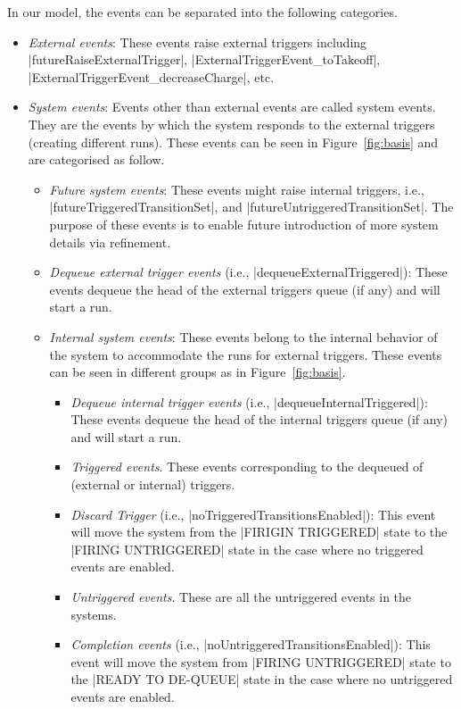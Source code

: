 In our \EventB model, the events can be separated into the following
categories.
\begin{itemize}
\item \emph{External events}: These events raise external triggers
  including |futureRaiseExternalTrigger|, |ExternalTriggerEvent_toTakeoff|,
  |ExternalTriggerEvent_decreaseCharge|, etc.
  
\item \emph{System events}: Events other than external events are
  called system events. They are the events by which the system responds to
  the external triggers (creating different runs).  These events can be
  seen in Figure~\ref{fig:basis} and are categorised as follow.
  \begin{itemize}
  \item \emph{Future system events}: These events might raise internal
    triggers, i.e., |futureTriggeredTransitionSet|, and
    |futureUntriggeredTransitionSet|.  The purpose of these events is
    to enable future introduction of more system details via refinement.
    
  \item \emph{Dequeue external trigger events} (i.e.,
    |dequeueExternalTriggered|): These events dequeue the head of the
    external triggers queue (if any) and will start a run.

  \item \emph{Internal system events}: These events belong to the
    internal behavior of the system to accommodate the runs for external
    triggers.  These events can be seen in different groups as in
    Figure~\ref{fig:basis}.
    \begin{itemize}
    \item \emph{Dequeue internal trigger events} (i.e.,
      |dequeueInternalTriggered|): These events dequeue the head of the
      internal triggers queue (if any) and will start a run.
    
    \item \emph{Triggered events}. These events corresponding to the
      dequeued of (external or internal) triggers.

    \item \emph{Discard Trigger} (i.e.,
      |noTriggeredTransitionsEnabled|):  This event will move the system
      from the |FIRIGIN TRIGGERED| state to the |FIRING UNTRIGGERED| state 
      in the case where no triggered events are enabled.
    
    \item \emph{Untriggered events}.  These are all the untriggered 
    events in the systems.

    \item \emph{Completion events} (i.e.,
      |noUntriggeredTransitionsEnabled|): This event will move the
      system from |FIRING UNTRIGGERED| state to the |READY TO DE-QUEUE|
      state in the case where no untriggered events are
      enabled.
    \end{itemize}
  \end{itemize}
\end{itemize}

